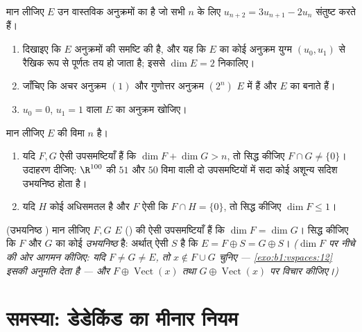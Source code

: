 \begin{exercise}[$\star\star$]\label{exo:b1:findim:10}
मान लीजिए $E$ उन वास्तविक अनुक्रमों का  है जो सभी $n$ के लिए $u_{n+2}
= 3u_{n+1} - 2u_n$ संतुष्ट करते हैं।
\begin{enumerate}
  \item दिखाइए कि $E$ अनुक्रमों की समष्टि की  है, और यह कि $E$ का
  कोई अनुक्रम युग्म $(u_0, u_1)$ से रैखिक रूप से पूर्णतः तय हो जाता है; इससे
  $\dim E = 2$ निकालिए।
  \item जाँचिए कि अचर अनुक्रम $(1)$ और गुणोत्तर अनुक्रम $(2^n)$ $E$ में हैं
  और $E$ का  बनाते हैं।
  \item $u_0 = 0$, $u_1 = 1$ वाला $E$ का अनुक्रम खोजिए।
\end{enumerate}
\end{exercise}

\begin{exercise}[$\star\star$]\label{exo:b1:findim:11}
मान लीजिए $E$ की विमा $n$ है।
\begin{enumerate}
  \item यदि $F, G$ ऐसी उपसमष्टियाँ हैं कि $\dim F + \dim G > n$, तो सिद्ध
  कीजिए $F \cap G \neq \{0\}$। उदाहरण दीजिए: $\R^{100}$ की $51$ और $50$ विमा
  वाली दो उपसमष्टियों में सदा कोई अशून्य सदिश उभयनिष्ठ होता है।
  \item यदि $H$ कोई अधिसमतल है और $F$ ऐसी  कि $F \cap H = \{0\}$, तो
  सिद्ध कीजिए $\dim F \leq 1$।
\end{enumerate}
\end{exercise}

\begin{exercise}[$\star\star\star$]\label{exo:b1:findim:12}
(उभयनिष्ठ ) मान लीजिए $F, G$ $E$ () की ऐसी उपसमष्टियाँ हैं कि
$\dim F = \dim G$। सिद्ध कीजिए कि $F$ और $G$ का कोई \emph{उभयनिष्ठ}  है:
अर्थात् ऐसी  $S$ है कि $E = F \oplus S = G \oplus S$। \emph{($\dim
F$ पर नीचे की ओर आगमन कीजिए: यदि $F \neq G \neq E$, तो $x \notin F \cup G$
चुनिए --- \cref{exo:b1:vspaces:12} इसकी अनुमति देता है --- और $F \oplus
\operatorname{Vect}(x)$ तथा $G \oplus \operatorname{Vect}(x)$ पर विचार
कीजिए।)}
\end{exercise}

\section{समस्या: डेडेकिंड का मीनार नियम}

